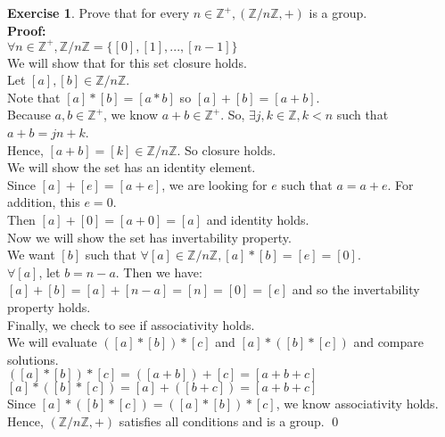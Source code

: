 \documentclass[12pt]{article}
\theoremstyle{definition}
\newtheorem{exercise}[theorem]{Exercise}
\newcommand{\Z}{\mathbb{Z}}
\newcommand{\V}{\vspace{0.3cm}\\}
\newcommand{\pro}{\V \textbf{Proof:} \V}
\begin{document}
\begin{exercise} Prove that for every $n\in\Z^+, (\Z/n\Z, +)$ is a group.
\pro $\forall n \in \Z^+, \Z/n\Z = \{[0], [1],...,[n-1]\}$ \V
We will show that for this set closure holds. \\
Let $[a],[b] \in \Z/n\Z$.\\
Note that $[a]*[b]=[a*b]$ so $[a] + [b] = [a+b]$.\\
Because $a,b \in \Z^+$, we know $a+b \in \Z^+$. 
So, $\exists j,k \in \Z, k<n$ such that $a + b = jn +k$.\\
Hence, $[a+b] = [k] \in \Z/n\Z$.  
So closure holds. \V
We will show the set has an identity element. \\
Since $[a] + [e] = [a+e]$, we are looking for $e$ such that $a = a+e$.  For addition, this $e=0$. \\
Then $[a] + [0] = [a+0] = [a]$ and identity holds. \V
Now we will show the set has invertability property.\\
We want $[b]$ such that $\forall [a] \in \Z/n\Z, [a]*[b] = [e] = [0]$. \\
$\forall [a]$, let $b = n-a$. Then we have:\\
$[a] + [b] = [a] + [n-a] = [n] = [0] = [e]$ and so the invertability property holds. \V
Finally, we check to see if associativity holds.\\
We will evaluate $([a]*[b])*[c]$ and $[a]*([b]*[c]) $ and compare solutions. \\
$([a]*[b])*[c] = ([a+b])+[c] = [a+b+c]$\\
$[a]*([b]*[c]) = [a] + ([b+c]) = [a+b+c]$\\
Since $[a]*([b]*[c]) = ([a]*[b])*[c]$, we know associativity holds. \V
Hence, $(\Z/n\Z, +)$ satisfies all conditions and is a group. \qed

\end{exercise}
\newpage
\end{document}
